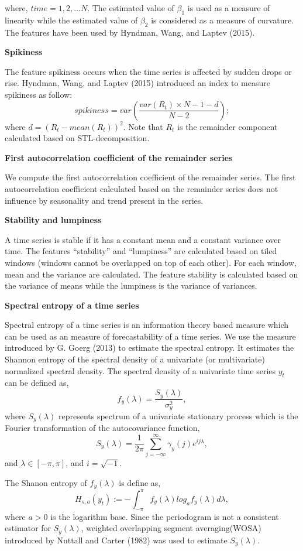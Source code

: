 \documentclass[11pt,]{article}
\theoremstyle{definition}
\theoremstyle{definition}
\theoremstyle{definition}
\theoremstyle{remark}
\begin{document}
where, \(time=1, 2, ...N\). The estimated value of \(\beta_1\) is used
as a measure of linearity while the estimated value of \(\beta_2\) is
considered as a measure of curvature. The features have been used by
Hyndman, Wang, and Laptev (2015).

\textbf{Spikiness}

The feature spikiness occurs when the time series is affected by sudden
drops or rise. Hyndman, Wang, and Laptev (2015) introduced an index to
measure spikiness as follow:
\[spikiness=var\left(\frac{var(R_t)\times N-1-d}{N-2}\right);\] where
\(d=(R_t-mean(R_t))^2\). Note that \(R_t\) is the remainder component
calculated based on STL-decomposition.

\textbf{First autocorrelation coefficient of the remainder series}

We compute the first autocorrelation coefficient of the remainder
series. The first autocorrelation coefficient calculated based on the
remainder series does not influence by seasonality and trend present in
the series.

\textbf{Stability and lumpiness}

A time series is stable if it has a constant mean and a constant
variance over time. The features ``stability'' and ``lumpiness'' are
calculated based on tiled windows (windows cannot be overlapped on top
of each other). For each window, mean and the variance are calculated.
The feature stability is calculated based on the variance of means while
the lumpiness is the variance of variances.

\textbf{Spectral entropy of a time series}

Spectral entropy of a time series is an information theory based measure
which can be used as an measure of forecastability of a time series. We
use the measure introduced by G. Goerg (2013) to estimate the spectral
entropy. It estimates the Shannon entropy of the spectral density of a
univariate (or multivariate) normalized spectral density. The spectral
density of a univariate time series \(y_t\) can be defined as,
\[f_y(\lambda)=\frac{S_y(\lambda)}{\sigma^2_y},\] where \(S_y(\lambda)\)
represents spectrum of a univariate stationary process which is the
Fourier transformation of the autocovariance function,
\[S_y(\lambda)=\frac{1}{2\pi}\sum_{j=-\infty}^{\infty}\gamma_{y}(j)e^{ij\lambda},\]
and \(\lambda \in [-\pi, \pi]\), and \(i=\sqrt{-1}\).

The Shanon entropy of \(f_y(\lambda)\) is define as,
\[ H_{s,a}(y_t):=-\int_{-\pi}^{\pi}f_y(\lambda)log_af_y({\lambda})d\lambda,\]
where \(a>0\) is the logarithm base. Since the periodogram is not a
consistent estimator for \(S_y(\lambda)\), weighted overlapping segment
averaging(WOSA) introduced by Nuttall and Carter (1982) was used to
estimate \(S_y(\lambda)\).
\end{document}
